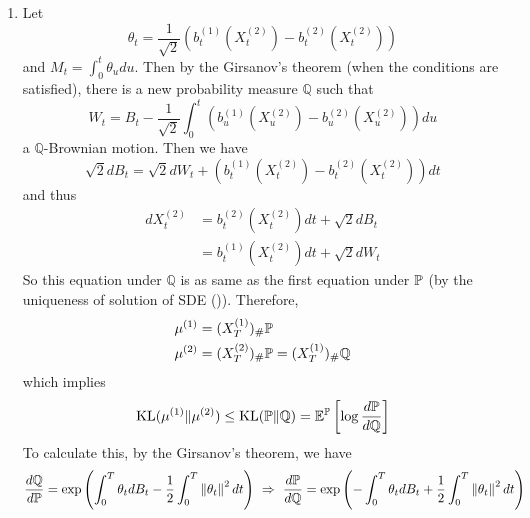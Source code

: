 \documentclass[a4paper,12pt]{article}
\begin{document}
\begin{enumerate}[label=(\arabic*)]
  \item Let
  \begin{equation*}
    \theta_t=\frac{1}{\sqrt{2}}\left(b_t^{(1)}(X_t^{(2)})-b_t^{(2)}(X_t^{(2)})\right)
  \end{equation*}
  and $M_t = \int_0^t \theta_u du$. Then by the Girsanov's theorem (when the conditions are satisfied), there is a new probability measure $\mathbb{Q}$ such that
  \begin{equation*}
    W_t = B_t - \frac{1}{\sqrt{2}} \int_0^t\left(b_u^{(1)}(X_u^{(2)})-b_u^{(2)}(X_u^{(2)})\right)du
  \end{equation*}
  a $\mathbb{Q}$-Brownian motion. Then we have
  \begin{equation*}
    \sqrt{2}dB_t = \sqrt{2}dW_t + \left(b_t^{(1)}(X_t^{(2)})-b_t^{(2)}(X_t^{(2)})\right)dt
  \end{equation*}
  and thus
  \begin{equation*}
    \begin{aligned}
      d X_t^{(2)}&=b_t^{(2)}(X_t^{(2)}) d t+\sqrt{2} d B_t \\
      &= b_t^{(1)}(X_t^{(2)})dt + \sqrt{2} d W_t
    \end{aligned}
  \end{equation*}
  So this equation under $\mathbb{Q}$ is as same as the first equation under $\mathbb{P}$ (by the uniqueness of solution of SDE (\cite{liptser2013statistics})). Therefore,
  \begin{equation*}
    \begin{aligned}
      \mu^{(1)} &= (X_T^{(1)})_{\#}\mathbb{P}\\
      \mu^{(2)} &= (X_T^{(2)})_{\#}\mathbb{P} =  (X_T^{(1)})_{\#}\mathbb{Q}
    \end{aligned}
  \end{equation*}
  which implies
  \begin{equation*}
    \operatorname{KL}(\mu^{(1)} \Vert \mu^{(2)}) \leq \operatorname{KL}(\mathbb{P} \Vert \mathbb{Q}) = \mathbb{E}^{\mathbb{P}}\left[\log \frac{d\mathbb{P}}{d\mathbb{Q}}\right]
  \end{equation*}
  To calculate this, by the Girsanov's theorem, we have
  \begin{equation*}
    \frac{d \mathbb{Q}}{d \mathbb{P}}=\exp \left(\int_0^T \theta_t d B_t-\frac{1}{2} \int_0^T \left\lVert\theta_t\right\lVert^2 d t\right)~\Rightarrow~\frac{d \mathbb{P}}{d \mathbb{Q}}=\exp \left(-\int_0^T \theta_t d B_t+\frac{1}{2} \int_0^T \left\lVert\theta_t\right\lVert^2 d t\right)
  \end{equation*}

\end{enumerate}
\end{document}
